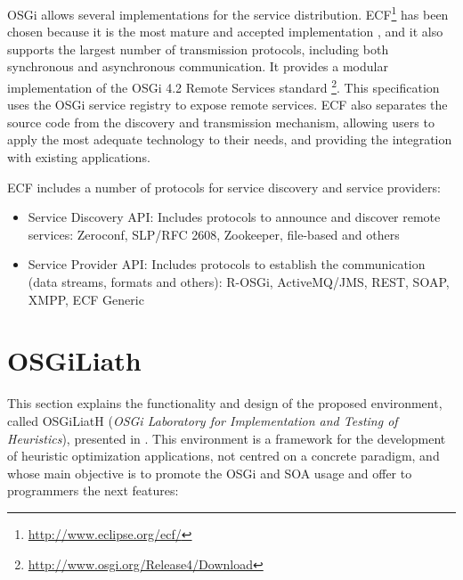 \documentclass{sig-alternate}
\begin{document}
OSGi allows several implementations for the service distribution. ECF\footnote{\url{http://www.eclipse.org/ecf/}} has been chosen because it is the most mature and accepted implementation \cite{petzold2011dynamic}, and it also supports the largest number of transmission protocols, including both synchronous and asynchronous communication. It provides a modular implementation of the OSGi 4.2 Remote Services standard \footnote{\url{http://www.osgi.org/Release4/Download}}. This specification uses the OSGi service registry to expose remote services. ECF also separates the source code from the discovery and transmission mechanism, allowing users to apply the most adequate technology to their needs, and providing the integration with existing applications. %

ECF includes a number of protocols for service discovery and service providers:
\begin{itemize}
\item Service Discovery API: Includes protocols to announce and discover remote services: Zeroconf, SLP/RFC 2608, Zookeeper, file-based and others
\item Service Provider API: Includes protocols to establish the communication (data streams, formats and others): R-OSGi, ActiveMQ/JMS, REST, SOAP, XMPP, ECF Generic
\end{itemize}

\section{OSGiLiath}
\label{sec:osgiliath}
This section explains the functionality and design of the proposed environment, called OSGiLiatH ({\em OSGi Laboratory for Implementation and Testing of Heuristics}), presented in \cite{OSGILIATHNICSO}. This environment is a  framework for the development of heuristic optimization applications, not centred on a concrete paradigm, and whose main objective is to promote the OSGi and SOA usage and offer to programmers the next features:
\end{document}
